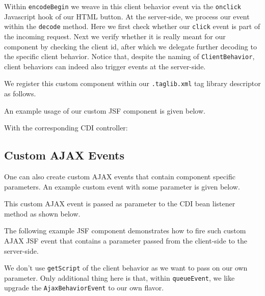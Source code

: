 Within \texttt{encodeBegin} we weave in this client behavior event via the \texttt{onclick} Javascript hook of our HTML button.
At the server-side, we process our event within the \texttt{decode} method.
Here we first check whether our \texttt{click} event is part of the incoming request.
Next we verify whether it is really meant for our component by checking the client id, after which we delegate further decoding to the specific client behavior.
Notice that, despite the naming of \texttt{ClientBehavior}, client behaviors can indeed also trigger events at the server-side.

We register this custom component within our \texttt{.taglib.xml} tag library descriptor as follows.


An example usage of our custom JSF component is given below.


With the corresponding CDI controller:


\subsection{Custom AJAX Events}

One can also create custom AJAX events that contain component specific parameters.
An example custom event with some parameter is given below.


This custom AJAX event is passed as parameter to the CDI bean listener method as shown below.


The following example JSF component demonstrates how to fire such custom AJAX JSF event that contains a parameter passed from the client-side to the server-side.

We don't use \texttt{getScript} of the client behavior as we want to pass on our own parameter.
Only additional thing here is that, within \texttt{queueEvent}, we like upgrade the \texttt{AjaxBehaviorEvent} to our own flavor.

